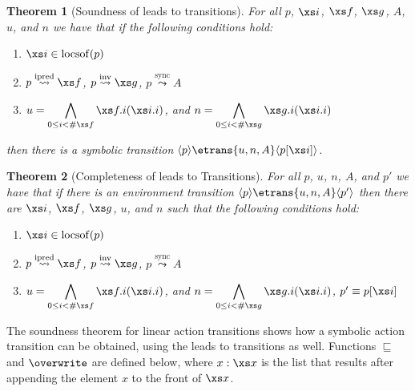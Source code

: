 \documentclass[submission,copyright,creativecommons,sharealike]{eptcs}
\newcommand{\sstate}[1]{\ensuremath{\langle #1 \rangle}}
\newcommand{\saof}[0]{
\ensuremath{\stackrel {\mathrm{sync}} {\leadsto}}
}
\newcommand{\ipredof}[0]{
\ensuremath{\stackrel {\mathrm{ipred}} {\leadsto}}
}
\newcommand{\invof}[0]{
\ensuremath{\stackrel {\mathrm{inv}} {\leadsto}}
}
\newtheorem{theorem}{Theorem}
\begin{document}
\begin{theorem}[Soundness of leads to transitions]
  For all $p$, $\xs i$, $\xs f$, $\xs g$, $A$, $u$, and $n$ we have
  that if the following conditions hold:
  \begin{enumerate}
  \item $\xs i \in \mathrm{locsof}(p)$
  \item $p \ipredof \xs f$, $p \invof \xs g$, $p \saof A$
  \item $u = \displaystyle \bigwedge_{0 \leq i < \#\xs f} \xs f{.}i
    (\xs i{.}i)$, and $n = \displaystyle \bigwedge_{0 \leq i < \# \xs
      g} \xs g {.} i (\xs i {.} i)$
  \end{enumerate}
  then there is a symbolic transition
$
    \sstate{p} \etrans{u, n, A} \sstate{p[\xs i]}
$.
\end{theorem}



\begin{theorem}[Completeness of leads to Transitions]
  For all $p$, $u$, $n$, $A$, and $p'$ we have that if there is an
  environment transition $\sstate{p} \etrans{u, n, A} \sstate{p'}$
  then there are $\xs i$, $\xs f$, $\xs g$, $u$, and $n$ such that the
  following conditions hold:
  \begin{enumerate}
  \item $\xs i \in \mathrm{locsof}(p)$
  \item $p \ipredof \xs f$, $p \invof \xs g$, $p \saof A$
  \item  $u = \displaystyle \bigwedge_{0 \leq i < \#\xs f} \xs f{.}i
    (\xs i{.}i)$, and $n = \displaystyle \bigwedge_{0 \leq i < \# \xs
      g} \xs g {.} i (\xs i {.} i)$,  $p' \equiv p[\xs i]$
  \end{enumerate}
\end{theorem}



The soundness theorem for linear action transitions shows how a
symbolic action transition can be obtained, using the leads to
transitions as well. Functions $\sqsubseteq$ and $\overwrite$ are
defined below, where $x:\xs x$ is
the list that results after appending the element $x$ to the front of $\xs x$.
\end{document}
